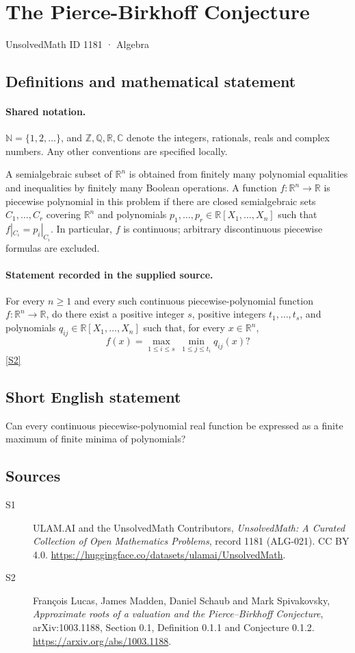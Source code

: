 \documentclass[11pt]{article}
\newcommand{\sref}[2]{\hyperlink{source:#1:#2}{[S#2]}}
\begin{document}
\setcounter{section}{1180}
\section{The Pierce-Birkhoff Conjecture}\label{1181}
{\small\sffamily UnsolvedMath ID 1181 · Algebra}
\subsection{Definitions and mathematical statement}

\paragraph{Shared notation.}$\mathbb N=\{1,2,\ldots\}$, and $\mathbb Z,\mathbb Q,\mathbb R,\mathbb C$ denote the integers, rationals, reals and complex numbers. Any other conventions are specified locally.


A semialgebraic subset of \(\mathbb R^n\) is obtained from finitely
many polynomial equalities and inequalities by finitely many Boolean
operations.  A function \(f:\mathbb R^n\to\mathbb R\) is piecewise
polynomial in this problem if there are closed semialgebraic sets
\(C_1,\ldots,C_r\) covering \(\mathbb R^n\) and polynomials
\(p_1,\ldots,p_r\in\mathbb R[X_1,\ldots,X_n]\) such that
\(f|_{C_i}=p_i|_{C_i}\).  In particular, \(f\) is continuous;
arbitrary discontinuous piecewise formulas are excluded.
\paragraph{Statement recorded in the supplied source.}
For every \(n\ge1\) and every such continuous piecewise-polynomial
function \(f:\mathbb R^n\to\mathbb R\), do there exist a positive
integer \(s\), positive integers \(t_1,\ldots,t_s\), and polynomials
\(q_{ij}\in\mathbb R[X_1,\ldots,X_n]\) such that, for every
\(x\in\mathbb R^n\),
\[
 f(x)=\max_{1\le i\le s}\ \min_{1\le j\le t_i}q_{ij}(x)?
\] \sref{1181}{2}
\subsection{Short English statement}
Can every continuous piecewise-polynomial real function be expressed as a finite maximum of finite minima of polynomials?
\subsection{Sources}
\begin{description}
\item[\hypertarget{source:1181:1}{S1}] ULAM.AI and the UnsolvedMath Contributors, \emph{UnsolvedMath: A Curated Collection of Open Mathematics Problems}, record 1181 (ALG-021). CC BY 4.0. \url{https://huggingface.co/datasets/ulamai/UnsolvedMath}.
\item[\hypertarget{source:1181:2}{S2}] Fran\c{c}ois Lucas, James Madden, Daniel Schaub and Mark Spivakovsky, \emph{Approximate roots of a valuation and the Pierce--Birkhoff Conjecture}, arXiv:1003.1188, Section 0.1, Definition 0.1.1 and Conjecture 0.1.2. \url{https://arxiv.org/abs/1003.1188}.
\end{description}
\label{end:1181}
\end{document}
